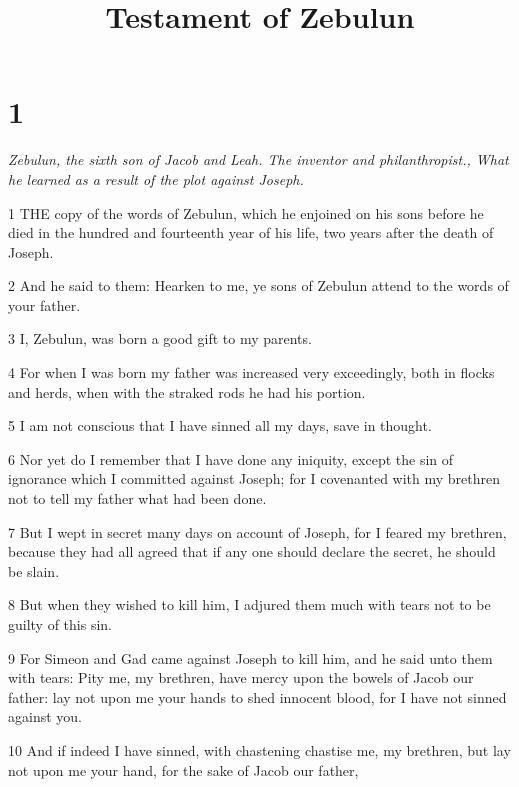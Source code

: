 

\title{Testament of Zebulun}

\chapter{1}

\par \textit{Zebulun, the sixth son of Jacob and Leah. The inventor and philanthropist., What he learned as a result of the plot against Joseph.}

\par 1 THE copy of the words of Zebulun, which he enjoined on his sons before he died in the hundred and fourteenth year of his life, two years after the death of Joseph.

\par 2 And he said to them: Hearken to me, ye sons of Zebulun attend to the words of your father.

\par 3 I, Zebulun, was born a good gift to my parents.

\par 4 For when I was born my father was increased very exceedingly, both in flocks and herds, when with the straked rods he had his portion.

\par 5 I am not conscious that I have sinned all my days, save in thought.

\par 6 Nor yet do I remember that I have done any iniquity, except the sin of ignorance which I committed against Joseph; for I covenanted with my brethren not to tell my father what had been done.

\par 7 But I wept in secret many days on account of Joseph, for I feared my brethren, because they had all agreed that if any one should declare the secret, he should be slain.

\par 8 But when they wished to kill him, I adjured them much with tears not to be guilty of this sin.

\par 9 For Simeon and Gad came against Joseph to kill him, and he said unto them with tears: Pity me, my brethren, have mercy upon the bowels of Jacob our father: lay not upon me your hands to shed innocent blood, for I have not sinned against you.

\par 10 And if indeed I have sinned, with chastening chastise me, my brethren, but lay not upon me your hand, for the sake of Jacob our father,

